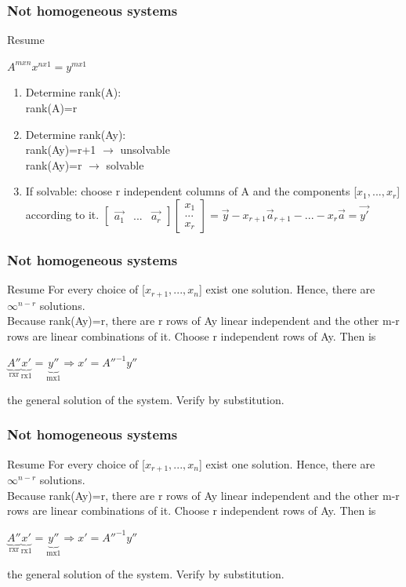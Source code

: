 \begin{frame}
	\frametitle{Not homogeneous systems}
	\begin{block}{Resume}
		\begin{center}
			$A^{mxn}x^{nx1}=y^{mx1}$
		\end{center}
		\begin{enumerate}
			\item Determine rank(A):\\
			rank(A)=r
			\item Determine rank(Ay):\\
			rank(Ay)=r+1 $\rightarrow$ unsolvable\\
			rank(Ay)=r $\rightarrow$ solvable
			\item If solvable: choose r independent columns of A and the components [$x_1,...,x_r$] according to it. $\begin{bmatrix} \overrightarrow{a_1} & ... & \overrightarrow{a_r} \end{bmatrix}\begin{bmatrix}
			x_1 \\ ... \\ x_r \end{bmatrix}=\overrightarrow{y}-x_{r+1}\overrightarrow{a}_{r+1}-...-x_r\overrightarrow{a}=\overrightarrow{y'}$
		\end{enumerate}
	\end{block}
\end{frame}

\begin{frame}
	\frametitle{Not homogeneous systems}
	\begin{block}{Resume}
		For every choice of [$x_{r+1},...,x_n$] exist one solution. Hence, there are $\infty^{n-r}$ solutions.\\
		Because rank(Ay)=r, there are r rows of Ay linear independent and the other m-r rows are linear combinations of it. Choose r independent rows of Ay. Then is
		\begin{center}
			$\underbrace{A''}_\text{rxr}\underbrace{x'}_\text{rx1}=\underbrace{y''}_\text{mx1} \Rightarrow x'=A''^{-1}y''$
		\end{center}
		the general solution of the system. Verify by substitution.
	\end{block}
\end{frame}

\begin{frame}
	\frametitle{Not homogeneous systems}
	\begin{block}{Resume}
		For every choice of [$x_{r+1},...,x_n$] exist one solution. Hence, there are $\infty^{n-r}$ solutions.\\
		Because rank(Ay)=r, there are r rows of Ay linear independent and the other m-r rows are linear combinations of it. Choose r independent rows of Ay. Then is
		\begin{center}
			$\underbrace{A''}_\text{rxr}\underbrace{x'}_\text{rx1}=\underbrace{y''}_\text{mx1} \Rightarrow x'=A''^{-1}y''$
		\end{center}
		the general solution of the system. Verify by substitution.
	\end{block}
\end{frame}

